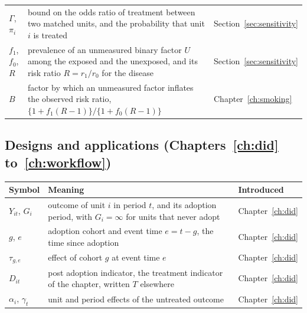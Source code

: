 {\noindent\small\centering
\setlength{\tabcolsep}{4pt}\renewcommand{\arraystretch}{1.1}
\begin{tabular}{>{\raggedright\arraybackslash}p{1.0in}>{\raggedright\arraybackslash}p{2.15in}>{\raggedright\arraybackslash}p{0.95in}}
$\Gamma$, $\pi_i$ & bound on the odds ratio of treatment between two matched units, and the probability that unit $i$ is treated & Section~\ref{sec:sensitivity} \\
$f_1$, $f_0$, $R$ & prevalence of an unmeasured binary factor $U$ among the exposed and the unexposed, and its risk ratio $R = r_1/r_0$ for the disease & Section~\ref{sec:sensitivity} \\
$B$ & factor by which an unmeasured factor inflates the observed risk ratio, $\{1 + f_1(R - 1)\}/\{1 + f_0(R - 1)\}$ & Chapter~\ref{ch:smoking} \\
\bottomrule
\end{tabular}\par}

\subsection*{Designs and applications (Chapters~\ref{ch:did} to~\ref{ch:workflow})}

{\noindent\small\centering
\setlength{\tabcolsep}{4pt}\renewcommand{\arraystretch}{1.1}
\begin{tabular}{>{\raggedright\arraybackslash}p{1.0in}>{\raggedright\arraybackslash}p{2.15in}>{\raggedright\arraybackslash}p{0.95in}}
\toprule
Symbol & Meaning & Introduced \\
\midrule
$Y_{it}$, $G_i$ & outcome of unit $i$ in period $t$, and its adoption period, with $G_i = \infty$ for units that never adopt & Chapter~\ref{ch:did} \\
$g$, $e$ & adoption cohort and event time $e = t - g$, the time since adoption & Chapter~\ref{ch:did} \\
$\tau_{g,e}$ & effect of cohort $g$ at event time $e$ & Chapter~\ref{ch:did} \\
$D_{it}$ & post adoption indicator, the treatment indicator of the chapter, written $T$ elsewhere & Chapter~\ref{ch:did} \\
$\alpha_i$, $\gamma_t$ & unit and period effects of the untreated outcome & Chapter~\ref{ch:did} \\
\end{tabular}\par}

